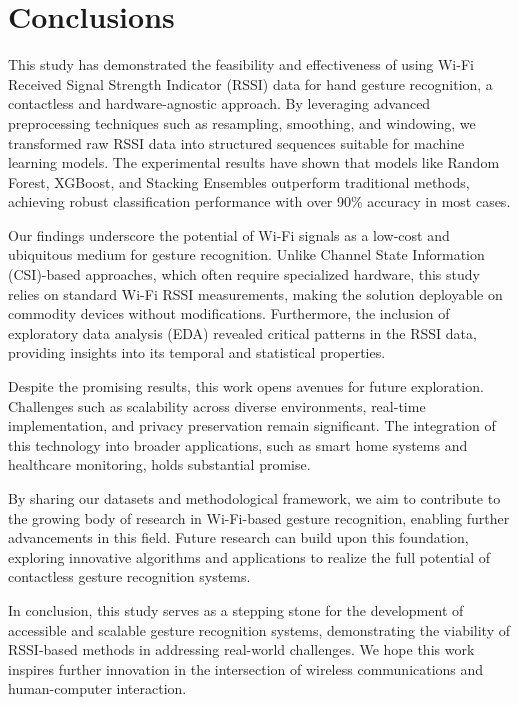 \documentclass[10pt,twocolumn,letterpaper]{article}
\begin{document}
\section{Conclusions}

This study has demonstrated the feasibility and effectiveness of using Wi-Fi Received Signal Strength Indicator (RSSI) data for hand gesture recognition, a contactless and hardware-agnostic approach. By leveraging advanced preprocessing techniques such as resampling, smoothing, and windowing, we transformed raw RSSI data into structured sequences suitable for machine learning models. The experimental results have shown that models like Random Forest, XGBoost, and Stacking Ensembles outperform traditional methods, achieving robust classification performance with over 90\% accuracy in most cases.

Our findings underscore the potential of Wi-Fi signals as a low-cost and ubiquitous medium for gesture recognition. Unlike Channel State Information (CSI)-based approaches, which often require specialized hardware, this study relies on standard Wi-Fi RSSI measurements, making the solution deployable on commodity devices without modifications. Furthermore, the inclusion of exploratory data analysis (EDA) revealed critical patterns in the RSSI data, providing insights into its temporal and statistical properties.

Despite the promising results, this work opens avenues for future exploration. Challenges such as scalability across diverse environments, real-time implementation, and privacy preservation remain significant. The integration of this technology into broader applications, such as smart home systems and healthcare monitoring, holds substantial promise.

By sharing our datasets and methodological framework, we aim to contribute to the growing body of research in Wi-Fi-based gesture recognition, enabling further advancements in this field. Future research can build upon this foundation, exploring innovative algorithms and applications to realize the full potential of contactless gesture recognition systems.


In conclusion, this study serves as a stepping stone for the development of accessible and scalable gesture recognition systems, demonstrating the viability of RSSI-based methods in addressing real-world challenges. We hope this work inspires further innovation in the intersection of wireless communications and human-computer interaction.

{\small


}
\end{document}
